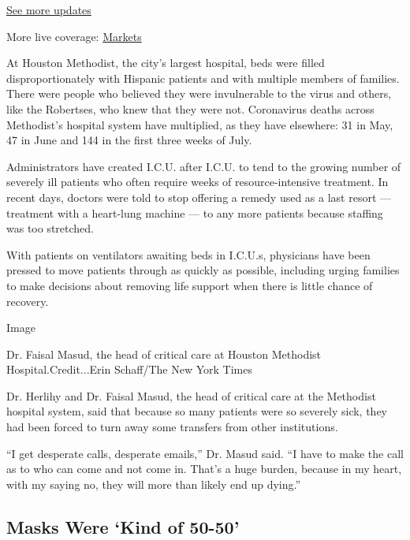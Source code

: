 \href{https://www.nytimes.com/2020/08/01/world/coronavirus-covid-19.html?action=click\&pgtype=Article\&state=default\&region=MAIN_CONTENT_1\&context=storylines_live_updates}{See
more updates}

More live coverage:
\href{https://www.nytimes.com/live/2020/07/31/business/stock-market-today-coronavirus?action=click\&pgtype=Article\&state=default\&region=MAIN_CONTENT_1\&context=storylines_live_updates}{Markets}

At Houston Methodist, the city's largest hospital, beds were filled
disproportionately with Hispanic patients and with multiple members of
families. There were people who believed they were invulnerable to the
virus and others, like the Robertses, who knew that they were not.
Coronavirus deaths across Methodist's hospital system have multiplied,
as they have elsewhere: 31 in May, 47 in June and 144 in the first three
weeks of July.

Administrators have created I.C.U. after I.C.U. to tend to the growing
number of severely ill patients who often require weeks of
resource-intensive treatment. In recent days, doctors were told to stop
offering a remedy used as a last resort --- treatment with a heart-lung
machine --- to any more patients because staffing was too stretched.

With patients on ventilators awaiting beds in I.C.U.s, physicians have
been pressed to move patients through as quickly as possible, including
urging families to make decisions about removing life support when there
is little chance of recovery.

Image

Dr. Faisal Masud, the head of critical care at Houston Methodist
Hospital.Credit...Erin Schaff/The New York Times

Dr. Herlihy and Dr. Faisal Masud, the head of critical care at the
Methodist hospital system, said that because so many patients were so
severely sick, they had been forced to turn away some transfers from
other institutions.

``I get desperate calls, desperate emails,'' Dr. Masud said. ``I have to
make the call as to who can come and not come in. That's a huge burden,
because in my heart, with my saying no, they will more than likely end
up dying.''

\hypertarget{masks-were-kind-of-50-50}{%
\subsection{Masks Were `Kind of 50-50'}\label{masks-were-kind-of-50-50}}

